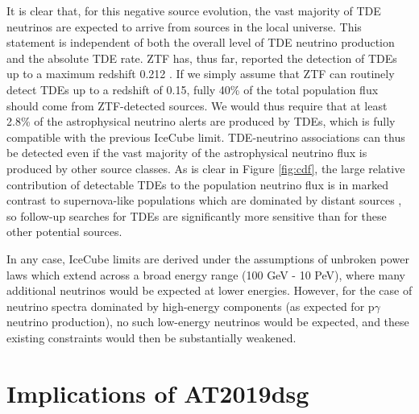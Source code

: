 It is clear that, for this negative source evolution, the vast majority of TDE neutrinos are expected to arrive from sources in the local universe. This statement is independent of both the overall level of TDE neutrino production and the absolute TDE rate. ZTF has, thus far, reported the detection of TDEs up to a maximum redshift 0.212 \cite{van_velzen_20}. If we simply assume that ZTF can routinely detect TDEs up to a redshift of 0.15, fully 40\% of the total population flux should come from ZTF-detected sources. We would thus require that at least 2.8\% of the astrophysical neutrino alerts are produced by TDEs, which is fully compatible with the previous IceCube limit. TDE-neutrino associations can thus be detected even if the vast majority of the astrophysical neutrino flux is produced by other source classes. As is clear in Figure \ref{fig:cdf}, the large relative contribution of detectable TDEs to the population neutrino flux is in marked contrast to supernova-like populations which are dominated by distant sources , so follow-up searches for TDEs are significantly more sensitive than for these other potential sources.

In any case, IceCube limits are derived under the assumptions of unbroken power laws which extend across a broad energy range (100 GeV - 10 PeV), where many additional neutrinos would be expected at lower energies.  However, for the case of neutrino spectra dominated by high-energy components (as expected for p$\gamma$ neutrino production), no such low-energy neutrinos would be expected, and these existing constraints would then be substantially weakened.

\section{Implications of AT2019dsg}

